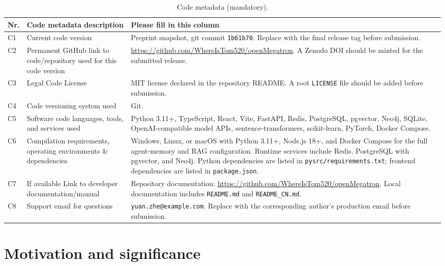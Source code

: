 \documentclass[preprint,12pt,a4paper]{elsarticle}
\begin{document}
\begin{table}[!h]
\centering
\begin{tabularx}{\textwidth}{|l|p{4.8cm}|X|}
\hline
\textbf{Nr.} & \textbf{Code metadata description} & \textbf{Please fill in this column} \\
\hline
C1 & Current code version & Preprint snapshot, git commit \texttt{1b61b70}. Replace with the final release tag before submission. \\
\hline
C2 & Permanent GitHub link to code/repository used for this code version & \url{https://github.com/WhereIsTom520/openMegatron}. A Zenodo DOI should be minted for the submitted release. \\
\hline
C3 & Legal Code License & MIT license declared in the repository README. A root \texttt{LICENSE} file should be added before submission. \\
\hline
C4 & Code versioning system used & Git. \\
\hline
C5 & Software code languages, tools, and services used & Python 3.11+, TypeScript, React, Vite, FastAPI, Redis, PostgreSQL, pgvector, Neo4j, SQLite, OpenAI-compatible model APIs, sentence-transformers, scikit-learn, PyTorch, Docker Compose. \\
\hline
C6 & Compilation requirements, operating environments \& dependencies & Windows, Linux, or macOS with Python 3.11+, Node.js 18+, and Docker Compose for the full agent-memory and RAG configuration. Runtime services include Redis, PostgreSQL with pgvector, and Neo4j. Python dependencies are listed in \texttt{pysrc/requirements.txt}; frontend dependencies are listed in \texttt{package.json}. \\
\hline
C7 & If available Link to developer documentation/manual & Repository documentation: \url{https://github.com/WhereIsTom520/openMegatron}. Local documentation includes \texttt{README.md} and \texttt{README\_CN.md}. \\
\hline
C8 & Support email for questions & \texttt{yuan.zhe@example.com}. Replace with the corresponding author's production email before submission. \\
\hline
\end{tabularx}
\caption{Code metadata (mandatory).}
\end{table}

\section{Motivation and significance}
\end{document}

